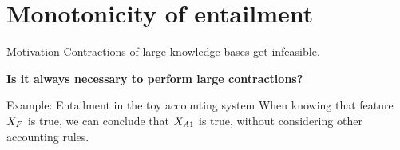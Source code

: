 \documentclass{beamer}
\begin{document}
    \section{Monotonicity of entailment}

    \begin{frame}{Motivation}
        Contractions of large knowledge bases get infeasible.
        \begin{center}
            \bf Is it always necessary to perform large contractions?
        \end{center}

        \begin{block}{Example: Entailment in the toy accounting system}
            When knowing that feature $X_{F}$ is true, we can conclude that $X_{A1}$ is true, without considering other accounting rules.
        \end{block}

    \end{frame}
\end{document}
